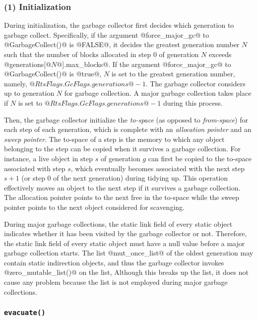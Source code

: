 \documentclass{article}
\begin{document}
\subsubsection{(1) Initialization}

During initialization, the garbage collector first decides which generation
to garbage collect.
Specifically, 
if the argument @force_major_gc@ to @GarbageCollect()@ is @FALSE@,
it decides the greatest generation number $N$ such
that the number of blocks allocated in step $0$ of generation $N$ exceeds
@generations[@$N$@].max_blocks@. 
If the argument @force_major_gc@ to @GarbageCollect()@ is @true@,
$N$ is set to the greatest generation number, namely, 
$@RtsFlags.GcFlags.generations@ - 1$.
The garbage collector considers up to generation $N$ for garbage collection.
A major garbage collection takes place if $N$ is set to 
$@RtsFlags.GcFlags.generations@ - 1$ during this process.

Then, the garbage collector initialize the \emph{to-space} (as opposed to
\emph{from-space}) for each step of 
each generation, which is complete with an \emph{allocation pointer} and
an \emph{sweep pointer}.
The to-space of a step is the memory to which any object belonging to the
step can be copied when it survives a garbage collection.
For instance, a live object in step $s$ of generation $g$ can first be copied
to the to-space associated with step $s$, which eventually becomes 
associated with the next step $s + 1$ (or step $0$ of the next generation)
during tidying up.
This operation effectively moves an object to the next step if it survives
a garbage collection. 
The allocation pointer points to the next free in the to-space while 
the sweep pointer points to the next object considered for scavenging.

During major garbage collections,
the static link field of every static object indicates whether it has
been visited by the garbage collector or not.
Therefore, the static link field of every static object must have
a null value before a major garbage collection starts. 
The list @mut_once_list@ of the oldest generation may contain static 
indirection objects, and thus 
the garbage collector invokes @zero_mutable_list()@ on the list,
Although this breaks up the list, it does not cause any problem because 
the list is not employed during major garbage collections.

\subsubsection{\tt evacuate()}
\end{document}
